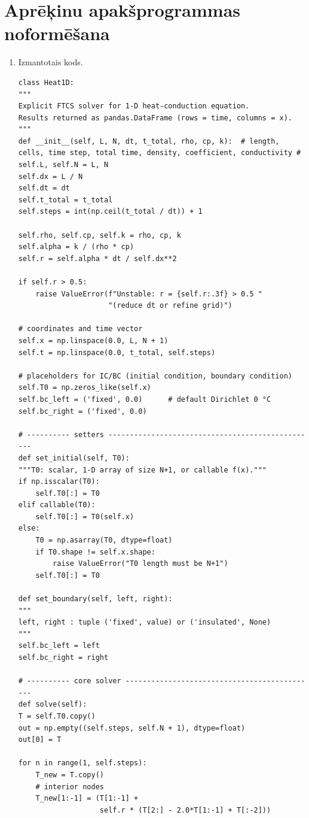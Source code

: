 \documentclass[12pt]{article}
\begin{document}
\newpage

\section*{Aprēķinu apakšprogrammas noformēšana}

\begin{enumerate}
    \item Izmantotais kods.
    \begin{verbatim}
class Heat1D:
"""
Explicit FTCS solver for 1-D heat-conduction equation.
Results returned as pandas.DataFrame (rows = time, columns = x).
"""
def __init__(self, L, N, dt, t_total, rho, cp, k):  # length, 
cells, time step, total time, density, coefficient, conductivity #
self.L, self.N = L, N
self.dx = L / N
self.dt = dt
self.t_total = t_total
self.steps = int(np.ceil(t_total / dt)) + 1

self.rho, self.cp, self.k = rho, cp, k
self.alpha = k / (rho * cp)
self.r = self.alpha * dt / self.dx**2

if self.r > 0.5:
    raise ValueError(f"Unstable: r = {self.r:.3f} > 0.5 "
                     "(reduce dt or refine grid)")

# coordinates and time vector
self.x = np.linspace(0.0, L, N + 1)
self.t = np.linspace(0.0, t_total, self.steps)

# placeholders for IC/BC (initial condition, boundary condition)
self.T0 = np.zeros_like(self.x)
self.bc_left = ('fixed', 0.0)      # default Dirichlet 0 °C
self.bc_right = ('fixed', 0.0)

# ---------- setters -------------------------------------------------
def set_initial(self, T0):
"""T0: scalar, 1-D array of size N+1, or callable f(x)."""
if np.isscalar(T0):
    self.T0[:] = T0
elif callable(T0):
    self.T0[:] = T0(self.x)
else:
    T0 = np.asarray(T0, dtype=float)
    if T0.shape != self.x.shape:
        raise ValueError("T0 length must be N+1")
    self.T0[:] = T0

def set_boundary(self, left, right):
"""
left, right : tuple ('fixed', value) or ('insulated', None)
"""
self.bc_left = left
self.bc_right = right

# ---------- core solver ---------------------------------------------
def solve(self):
T = self.T0.copy()
out = np.empty((self.steps, self.N + 1), dtype=float)
out[0] = T

for n in range(1, self.steps):
    T_new = T.copy()
    # interior nodes
    T_new[1:-1] = (T[1:-1] +
                   self.r * (T[2:] - 2.0*T[1:-1] + T[:-2]))


\end{verbatim}
\end{enumerate}
\end{document}
